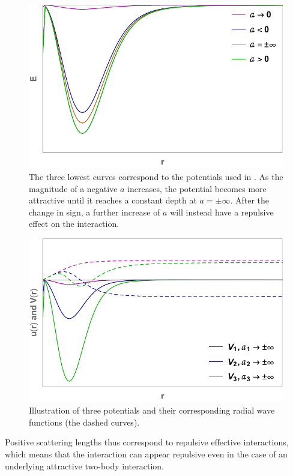 \begin{figure}
	\includegraphics[width=\linewidth]{potential_depth.pdf}
	\caption{The three lowest curves correspond to the potentials used in . As the magnitude of a negative $a$ increases, the potential becomes more attractive until it reaches a constant depth at $a=\pm\infty$. After the change in sign, a further increase of $a$ will instead have a repulsive effect on the interaction.}
	\label{fig:potential_depth}
\end{figure}

\begin{figure}
	\includegraphics[width=\linewidth]{scattapp.pdf}
	\caption{Illustration of three potentials and their corresponding radial wave functions (the dashed curves).}
	\label{fig:scattapp}
\end{figure}

Positive scattering lengths thus correspond to repulsive effective interactions, which means that the interaction can appear repulsive even in the case of an underlying attractive two-body interaction.